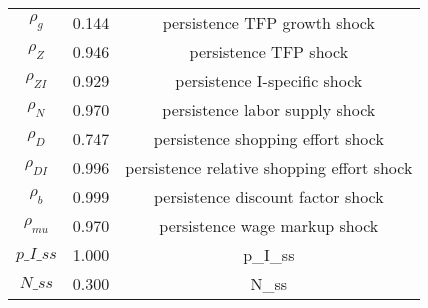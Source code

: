 \begin{center}
\begin{longtable}{ccc}
${\rho_g}$ 	 & 	 0.144 	 & 	 persistence TFP growth shock\\
${\rho_Z}$ 	 & 	 0.946 	 & 	 persistence TFP shock\\
${\rho_{ZI}}$ 	 & 	 0.929 	 & 	 persistence I-specific shock\\
${\rho_N}$ 	 & 	 0.970 	 & 	 persistence labor supply shock\\
${\rho_D}$ 	 & 	 0.747 	 & 	 persistence shopping effort shock\\
${\rho_{DI}}$ 	 & 	 0.996 	 & 	 persistence relative shopping effort shock\\
${\rho_b}$ 	 & 	 0.999 	 & 	 persistence discount factor shock\\
${\rho_{mu}}$ 	 & 	 0.970 	 & 	 persistence wage markup shock\\
$p\_I\_ss$ 	 & 	 1.000 	 & 	 p\_I\_ss\\
$N\_ss$ 	 & 	 0.300 	 & 	 N\_ss\\
\bottomrule%
\end{longtable}
\end{center}
